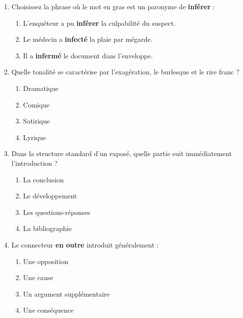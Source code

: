 \documentclass[11pt]{article}
\begin{document}
\begin{exercice}
\begin{enumerate}
    \item Choisissez la phrase où le mot en gras est un paronyme de \textbf{inférer} :
    \begin{enumerate}
        \item L'enquêteur a pu \textbf{inférer} la culpabilité du suspect.
        \item Le médecin a \textbf{infecté} la plaie par mégarde.
        \item Il a \textbf{infermé} le document dans l'enveloppe.
    \end{enumerate}
    \item Quelle tonalité se caractérise par l'exagération, le burlesque et le rire franc ?
    \begin{enumerate}
        \item Dramatique \item Comique \item Satirique \item Lyrique
    \end{enumerate}
    \item Dans la structure standard d'un exposé, quelle partie suit immédiatement l'introduction ?
    \begin{enumerate}
        \item La conclusion \item Le développement \item Les questions-réponses \item La bibliographie
    \end{enumerate}
    \item Le connecteur \og \textbf{en outre} \fg{} introduit généralement :
    \begin{enumerate}
        \item Une opposition \item Une cause \item Un argument supplémentaire \item Une conséquence
    \end{enumerate}
\end{enumerate}
\end{exercice}
\end{document}
